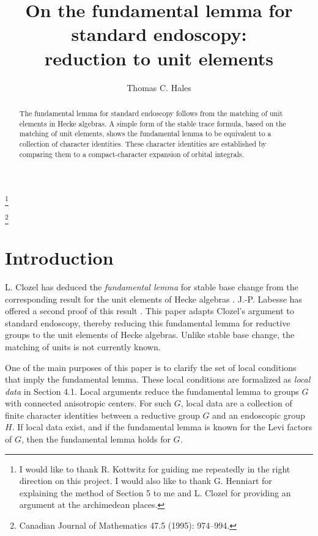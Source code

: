 \documentclass{amsart}
\begin{document}
\title[Fundamental Lemma for Standard Endoscopy]{On the fundamental 
		 lemma for standard endoscopy:
		 \\ reduction to unit elements }

\author {Thomas C. Hales}

\address{ University of Michigan}



\begin{abstract}
The fundamental lemma for standard endoscopy 
follows from the matching of unit elements in Hecke algebras. 
A simple form of the stable trace formula,
based on the matching of unit elements, shows the
fundamental lemma to be equivalent to a collection of
character identities.  These character identities are
established by comparing them to a compact-character
expansion of orbital integrals.
\end{abstract}

\thanks{I would like to thank R. Kottwitz for guiding me repeatedly
in the right direction on this project.  I would also like to
thank G. Henniart for explaining the method of Section 5 to me
and L. Clozel for providing an argument at the archimedean places.}

\thanks{Canadian Journal of Mathematics 47.5 (1995): 974--994.}



\maketitle


\section{Introduction }%

L. Clozel has deduced the {\it fundamental lemma} for stable
base change from the corresponding result for the unit elements
of Hecke algebras \cite{Cl2}.  J.-P. Labesse has offered a second proof
of this result \cite{La}. This paper adapts Clozel's argument to standard
endoscopy, thereby reducing this fundamental lemma for reductive
groups to the
unit elements of Hecke algebras.
Unlike stable base change, the matching of units is not
currently known.

One of the main purposes of this paper is to clarify the set of
local conditions that imply the fundamental lemma.  These
local conditions are formalized as {\it local data\/} in Section
4.1.  Local arguments reduce the fundamental lemma to 
groups $G$ with connected anisotropic centers.  For such $G$, 
local data are a collection of finite
character identities between a reductive group $G$ and an endoscopic
group $H$.  If local data exist, and if the fundamental lemma
is known for the Levi factors of $G$, then the fundamental lemma
holds for $G$.
\end{document}
